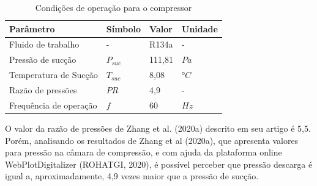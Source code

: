 \begin{table}[htb]
	\ABNTEXfontereduzida
	\caption{\label{tab:Tab_2}Condições de operação para o compressor}
	\begin{center}
	\begin{tabular}{p{5.0cm}p{1.5cm}p{2cm}p{2.5cm}}
		\toprule
		\textbf{Parâmetro} &  \textbf{Símbolo}      & \textbf{Valor} & \textbf{Unidade}    \\ \midrule
	    Fluido de trabalho              & -              & R134a        & -                                      \\
		Pressão de sucção               & $P_{suc}$          & 111,81   & $Pa$                                        \\
		Temperatura de Sucção           & $T_{suc}$          & 8,08     & $°C$                                       \\
        Razão de pressões               & $PR$       & 4,9              & -                                        \\ 
		Frequência de operação          & $f$       & 60                & $Hz$                                     \\  \bottomrule
	\end{tabular}
	\end{center}
\end{table}


O valor da razão de pressões de Zhang et al. (2020a) descrito em seu artigo é 5,5. Porém, analisando os resultados de Zhang et al (2020a), que apresenta valores para pressão na câmara de compressão, e com ajuda da plataforma online WebPlotDigitalizer (ROHATGI, 2020), é possível perceber que pressão descarga é igual a, aproximadamente, 4,9 vezes maior que a pressão de sucção.



